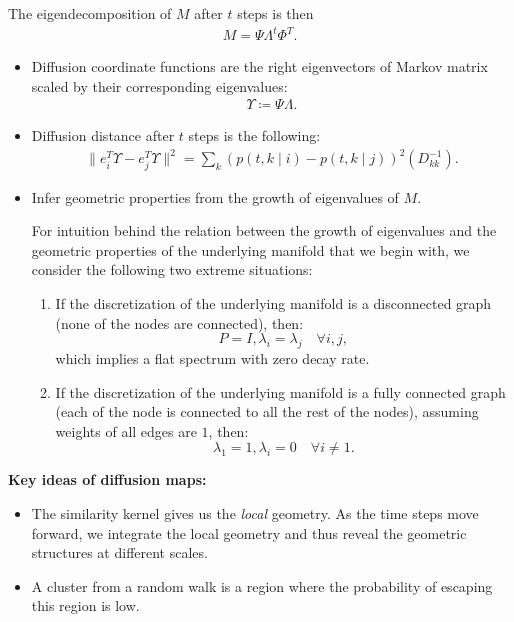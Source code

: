 \begin{enumerate}
    The eigendecomposition of $M$ after $t$ steps is then
    \begin{align}
        M = \Psi \Lambda^t \Phi^T.
    \end{align}
    \begin{itemize}
        \item Diffusion coordinate functions are the right eigenvectors of Markov matrix scaled by their corresponding eigenvalues: 
        \begin{align}
            \Upsilon \coloneqq \Psi \Lambda.
        \end{align}
        \item Diffusion distance after $t$ steps is the following:
       \begin{align}
            \| e_i^T  \Upsilon - e_j^T \Upsilon  \|^2 = \sum_{k} (p(t,k\mid i) - p(t,k\mid j))^2 (D_{k k}^{-1}).
       \end{align}
       
       \item Infer geometric properties from the growth of eigenvalues of $M$.
       
       For intuition behind the relation between the growth of eigenvalues and the geometric properties of the underlying manifold that we begin with, we consider the following two extreme situations:
       \begin{enumerate}
           \item If the discretization of the underlying manifold is a disconnected graph (none of the nodes are connected), then:
           \[P = I, \lambda_i = \lambda_j \quad \forall i, j, \]
           which implies a flat spectrum with zero decay rate.
           \item If the discretization of the underlying manifold is a fully connected graph (each of the node is connected to all the rest of the nodes), assuming weights of all edges are $1$, then:
            \[\lambda_1 = 1, \lambda_i = 0 \quad \forall i \neq 1.\]
       \end{enumerate}
    \end{itemize}
\end{enumerate}

\par \textbf{Key ideas of diffusion maps: }
\begin{itemize}
    \item The similarity kernel gives us the \textit{local} geometry. As the time steps move forward, we integrate the local geometry and thus reveal the geometric structures at different scales. 
    \item A cluster from a random walk is a region where the probability of escaping this region is low.
\end{itemize}

